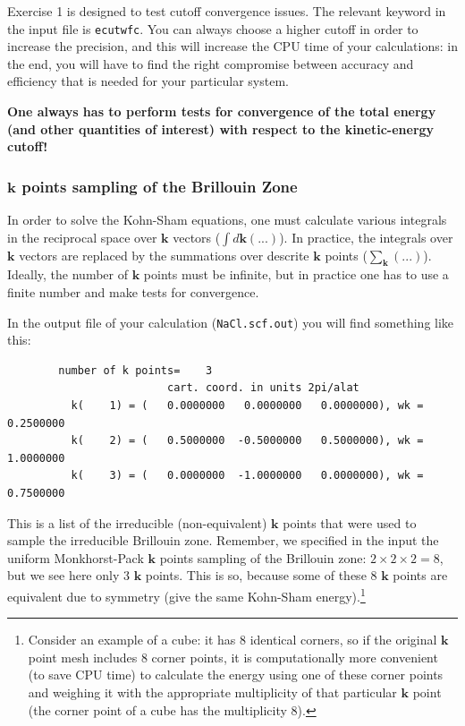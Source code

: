 \documentclass[12pt]{article}
\begin{document}
    Exercise 1 is designed to test cutoff convergence issues.
    The relevant keyword in the input file is {\tt ecutwfc}.
    You can always choose a higher cutoff in order to increase the precision,
    and this will increase the CPU time of your calculations: in the end,
    you will have to find the right compromise between accuracy and
    efficiency that is needed for your particular system.

    {\bf One always has to perform tests for convergence of the total energy
    (and other quantities of interest) with respect to the kinetic-energy cutoff!}


\subsubsection {$\mathbf{k}$ points sampling of the Brillouin Zone} 

    In order to solve the Kohn-Sham equations, one must calculate various integrals
    in the reciprocal space over $\mathbf{k}$ vectors ($\int d\mathbf{k} (...)$).
    In practice, the integrals over $\mathbf{k}$ vectors are replaced by the summations
    over descrite $\mathbf{k}$ points ($\sum_\mathbf{k} (...)$). Ideally, the number of
    $\mathbf{k}$ points must be infinite, but in practice one has to use a finite number
    and make tests for convergence.

    In the output file of your calculation ({\tt NaCl.scf.out}) you will find something
    like this:
    \begin{verbatim}
        number of k points=    3
                         cart. coord. in units 2pi/alat
          k(    1) = (   0.0000000   0.0000000   0.0000000), wk =   0.2500000
          k(    2) = (   0.5000000  -0.5000000   0.5000000), wk =   1.0000000
          k(    3) = (   0.0000000  -1.0000000   0.0000000), wk =   0.7500000
    \end{verbatim}

    This is a list of the irreducible (non-equivalent) $\mathbf{k}$ points that were
    used to sample the irreducible Brillouin zone. Remember, we specified in the input
    the uniform Monkhorst-Pack $\mathbf{k}$ points sampling of the Brillouin zone:
    $2 \times 2 \times 2 = 8$, but we see here only 3 $\mathbf{k}$ points.
    This is so, because some of these 8 $\mathbf{k}$ points are equivalent due to
    symmetry (give the same Kohn-Sham energy).\footnote{Consider an example of a cube: it has 8 identical corners, so if the original $\mathbf{k}$ point mesh includes 8 corner points,
    it is computationally more convenient (to save CPU time) to calculate the energy using
    one of these corner points and weighing it with the appropriate multiplicity of that
    particular $\mathbf{k}$ point (the corner point of a cube has the multiplicity 8).} 
\end{document}
